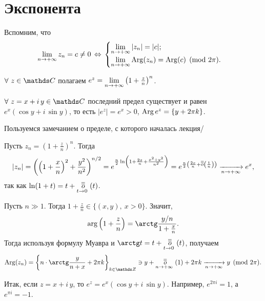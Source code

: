 \section{Экспонента}
Вспомним, что 
\[
	\yop z_n = c\ne 0\iff
	\begin{cases}
		\yop|z_n|=|c|;\\
		\yop\Arg(z_n) = \Arg(c)\pmod{2\pi}.
	\end{cases}
\]
\begin{Def}
	$\forall\ z\in \C$ полагаем $e^z = \yop\left(1+\frac zn\right)^n$.
\end{Def}
\begin{Ut}
	$\forall\ z=x+i\, y\in\C$ последний предел существует и равен $e^x(\cos y + i\, \sin y)$, то есть $|e^z| = e^x>0$, $\Arg e^z = \{y+2\pi k\}$.
\end{Ut}
\begin{Proof}
	Пользуемся замечанием о пределе, с которого началась лекция/
	\begin{roItems}
	\item Пусть $z_n = \left(1+\frac zn\right)^n$. Тогда 
		\[
			|z_n| = \left(\left(1+\frac xn\right)^2 + \frac{y^2}{n^2}\right)^{n/2} = 
			e^{\frac n2\ln\left(1+\frac{2x}n + \frac{x^2+y^2}{n^2}\right)} =
			e^{\frac n2\left(\frac{2x}n + \oo\left(\frac1n\right)\right)}\te e^x,
		\]
		так как $\ln(1+t) = t+ \ooo t{t\to0}$.
	\item Пусть $n\gg1$. Тогда $1+\frac zn\in\big\{(x,y),\ x>0\big\}$. Значит, 
		\[
			\arg\left(1+\frac zn\right) = \arctg\frac{y/n}{1+\frac xn}.
		\]
		Тогда используя формулу Муавра и $\arctg t  = t + \ooo t{t\to0}$, получаем
		\[
			\Arg(z_n) = \left\{n\cdot \arctg\frac{y}{n+x} + 2\pi k\right\}_{k\in\Z} \ni y + \ooo1{n\to+\infty} + 2\pi k \te y\pmod{2\pi}.
		\]
	\end{roItems}
\end{Proof}

Итак, если $z = x+i\, y$, то  $e^z = e^x(\cos y + i\,\sin y)$. Например, $e^{2\pi i} = 1$, а $e^{\pi i} = -1$.

